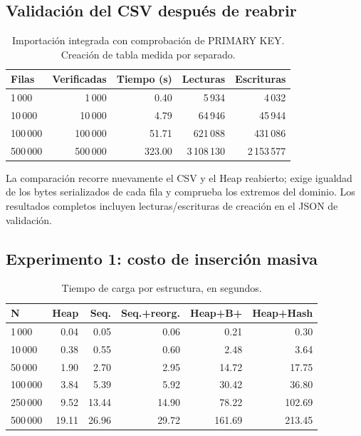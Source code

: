 \subsection{Validación del CSV después de reabrir}

\begin{table}[H]\centering\small
\caption{Importación integrada con comprobación de PRIMARY KEY. Creación de tabla medida por separado.}
\begin{tabular}{lrrrr}
\toprule
Filas & Verificadas & Tiempo (s) & Lecturas & Escrituras \\
\midrule
1\,000 & 1\,000 & 0.40 & 5\,934 & 4\,032 \\
10\,000 & 10\,000 & 4.79 & 64\,946 & 45\,944 \\
100\,000 & 100\,000 & 51.71 & 621\,088 & 431\,086 \\
500\,000 & 500\,000 & 323.00 & 3\,108\,130 & 2\,153\,577 \\
\bottomrule\end{tabular}\end{table}

La comparación recorre nuevamente el CSV y el Heap reabierto; exige igualdad de los bytes serializados de cada fila y comprueba los extremos del dominio. Los resultados completos incluyen lecturas/escrituras de creación en el JSON de validación.

\clearpage\subsection{Experimento 1: costo de inserción masiva}

\begin{table}[H]\centering\small
\caption{Tiempo de carga por estructura, en segundos.}
\begin{tabular}{lrrrrr}
\toprule
N & Heap & Seq. & Seq.+reorg. & Heap+B+ & Heap+Hash \\
\midrule
1\,000 & 0.04 & 0.05 & 0.06 & 0.21 & 0.30 \\
10\,000 & 0.38 & 0.55 & 0.60 & 2.48 & 3.64 \\
50\,000 & 1.90 & 2.70 & 2.95 & 14.72 & 17.75 \\
100\,000 & 3.84 & 5.39 & 5.92 & 30.42 & 36.80 \\
250\,000 & 9.52 & 13.44 & 14.90 & 78.22 & 102.69 \\
500\,000 & 19.11 & 26.96 & 29.72 & 161.69 & 213.45 \\
\bottomrule\end{tabular}\end{table}


